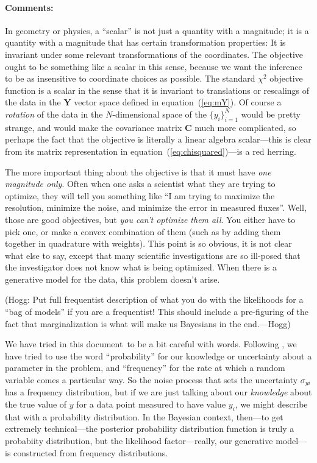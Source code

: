 \documentclass[12pt,twoside]{article}
\newcommand{\documentname}{document}
\newcommand{\equationname}{equation}
\newcommand{\commentsname}{Comments}
\newcounter{problem}
\newenvironment{comments}{\paragraph{\commentsname:}}{}
\newcommand{\mmatrix}[1]{\boldsymbol{#1}}
\newcommand{\mC}{\mmatrix{C}}
\newcommand{\mY}{\mmatrix{Y}}
\newcommand{\setofall}[3]{\{{#1}\}_{{#2}}^{{#3}}}
\newcommand{\ally}{\setofall{y_i}{i=1}{N}}
\begin{document}
\begin{comments}
In geometry or physics, a ``scalar'' is not just a quantity with a
magnitude; it is a quantity with a magnitude that has certain
transformation properties: It is invariant under some relevant
transformations of the coordinates.  The objective ought to be
something like a scalar in this sense, because we want the inference
to be as insensitive to coordinate choices as possible.  The standard
$\chi^2$ objective function is a scalar in the sense that it is
invariant to translations or rescalings of the data in the $\mY$
vector space defined in \equationname~(\ref{eq:mY}).  Of course a
\emph{rotation} of the data in the $N$-dimensional space of the
$\ally$ would be pretty strange, and would make the covariance matrix
$\mC$ much more complicated, so perhaps the fact that the objective is
literally a linear algebra scalar---this is clear from its matrix
representation in \equationname~(\ref{eq:chisquared})---is a red
herring.

The more important thing about the objective is that it must have
\emph{one magnitude only}.  Often when one asks a scientist what they
are trying to optimize, they will tell you something like ``I am
trying to maximize the resolution, minimize the noise, and minimize
the error in measured fluxes''.  Well, those are good objectives, but
\emph{you can't optimize them all}.  You either have to pick one, or
make a convex combination of them (such as by adding them together in
quadrature with weights).  This point is so obvious, it is not clear
what else to say, except that many scientific investigations are so
ill-posed that the investigator does not know what is being optimized.
When there is a generative model for the data, this problem doesn't
arise.

(Hogg: Put full frequentist description of what you do with the
likelihoods for a ``bag of models'' if you are a frequentist!  This
should include a pre-figuring of the fact that marginalization is what
will make us Bayesians in the end.---Hogg)

We have tried in this \documentname\ to be a bit careful with words.
Following \citet{jaynes}, we have tried to use the word
``probability'' for our knowledge or uncertainty about a parameter in
the problem, and ``frequency'' for the rate at which a random variable
comes a particular way.  So the noise process that sets the
uncertainty $\sigma_{yi}$ has a frequency distribution, but if we are
just talking about our \emph{knowledge} about the true value of $y$
for a data point measured to have value $y_i$, we might describe that
with a probability distribution.  In the Bayesian context, then---to
get extremely technical---the posterior probability distribution
function is truly a probabiity distribution, but the likelihood
factor---really, our generative model---is constructed from frequency
distributions.


\end{comments}
\end{document}
